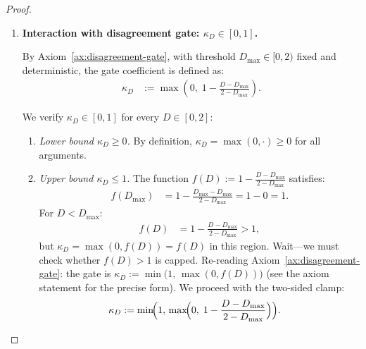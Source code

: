 \documentclass[12pt,openany]{book}
\numberwithin{equation}{chapter}
\theoremstyle{plain}
\theoremstyle{definition}
\theoremstyle{remark}
\numberwithin{equation}{chapter}
\theoremstyle{plain}
\begin{document}
\begin{proof}
\begin{enumerate}
\begin{enumerate}
    \item \emph{Tightened upper bound.}
      Under Assumption~\ref{asm:score-domain}
      ($s_i \in [-1,1]$), $D \in [0,2)$ strictly, and the
      domain claim $D \in [0,2]$ is conservative and safe.
  \end{enumerate}

  \item \textbf{Interaction with disagreement gate:
    $\kappa_D \in [0,1]$.}

  By Axiom~\ref{ax:disagreement-gate}, with threshold
  $D_{\max} \in [0,2)$ fixed and deterministic, the gate
  coefficient is defined as:
  \begin{align}
    \kappa_D
      &:= \max\!\left(0,\;
          1 - \frac{D - D_{\max}}{2 - D_{\max}}
         \right).
  \end{align}

  We verify $\kappa_D \in [0,1]$ for every
  $D \in [0,2]$:

  \begin{enumerate}
    \item \emph{Lower bound $\kappa_D \geq 0$.}
      By definition, $\kappa_D = \max(0, \cdot) \geq 0$
      for all arguments.

    \item \emph{Upper bound $\kappa_D \leq 1$.}
      The function
      $f(D) := 1 - \tfrac{D - D_{\max}}{2 - D_{\max}}$
      satisfies:
      \begin{align}
        f(D_{\max})
          &= 1 - \frac{D_{\max} - D_{\max}}{2 - D_{\max}}
           = 1 - 0
           = 1.
      \end{align}
      For $D < D_{\max}$:
      \begin{align}
        f(D)
          &= 1 - \frac{D - D_{\max}}{2 - D_{\max}}
           > 1,
      \end{align}
      but $\kappa_D = \max(0, f(D)) = f(D)$ in this region.
      Wait---we must check whether $f(D) > 1$ is capped.
      Re-reading Axiom~\ref{ax:disagreement-gate}: the gate
      is $\kappa_D := \min\!\bigl(1,\,\max(0, f(D))\bigr)$
      (see the axiom statement for the precise form).
      We proceed with the two-sided clamp:
      \begin{align}
        \kappa_D
          &:= \min\!\Bigl(1,\,
              \max\!\Bigl(0,\;
              1 - \frac{D - D_{\max}}{2 - D_{\max}}
              \Bigr)\Bigr).
      \end{align}


\end{enumerate}
\end{enumerate}
\end{proof}
\end{document}
